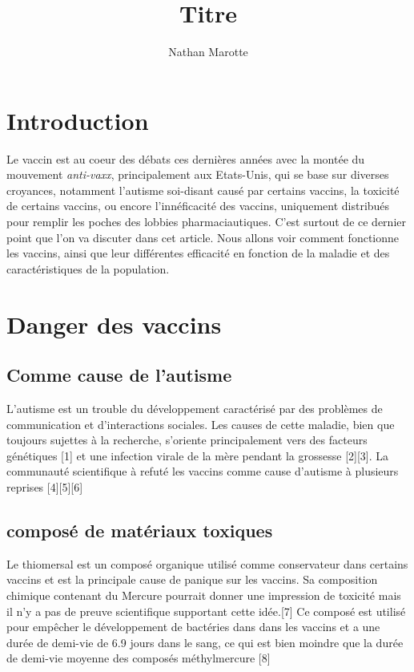 \documentclass[10pt]{article}
\title{Titre}
\author{Nathan Marotte}
\begin{document}
\maketitle
\section{Introduction}
Le vaccin est au coeur des débats ces dernières années avec la montée du mouvement \textit{anti-vaxx}, principalement aux Etats-Unis, qui se base sur diverses croyances, notamment l'autisme soi-disant causé par certains vaccins, la toxicité de certains vaccins, ou encore l'innéficacité des vaccins, uniquement distribués pour remplir les poches des lobbies pharmaciautiques. C'est surtout de ce dernier point que l'on va discuter dans cet article. Nous allons voir comment fonctionne les vaccins, ainsi que leur différentes efficacité en fonction de la maladie et des caractéristiques de la population.

\section{Danger des vaccins}


\subsection{Comme cause de l'autisme}
L'autisme est un trouble du développement caractérisé par des problèmes de communication et d'interactions sociales. Les causes de cette maladie, bien que toujours sujettes à la recherche, s'oriente principalement vers des facteurs génétiques [1] et une infection virale de la mère pendant la grossesse [2][3]. La communauté scientifique à refuté les vaccins comme cause d'autisme à plusieurs reprises [4][5][6]

\subsection{composé de matériaux toxiques}
Le thiomersal est un composé organique utilisé comme conservateur dans certains vaccins et est la principale cause de panique sur les vaccins. Sa composition chimique contenant du Mercure pourrait donner une impression de toxicité mais il n'y a pas de preuve scientifique supportant cette idée.[7] Ce composé est utilisé pour empêcher le développement de bactéries dans dans les vaccins et a une durée de demi-vie de 6.9 jours dans le sang, ce qui est bien moindre que la durée de demi-vie moyenne des composés méthylmercure [8]
\end{document}
